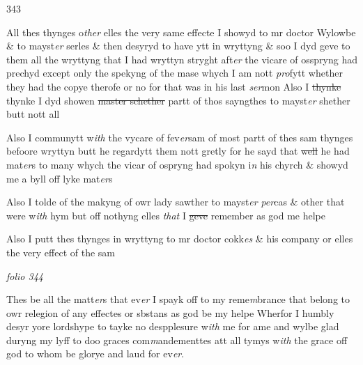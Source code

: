 \documentclass[12pt, a4paper]{book}
\begin{document}
\begin{flushright}{\color{Mahogany}343}\end{flushright}
            		
		\ifthenelse{\isodd{\thepage}}
		{\reversemarginpar}
		{\normalmarginpar}
		All thes thynges o\textit{ther} elles the very same effecte
I showyd to mr doctor Wylowbe \& to mayst\textit{er} serles
\& then desyryd to have ytt in wryttyng \& soo
I dyd geve to them all the wryttyng that I 
had wryttyn stryght aft\textit{er} the vicare of osspryng had
prechyd except only the spekyng of the mase
whych I am nott \textit{pro}fytt whether they had the 
copye therofe or no for that was in his
			 last \textit{ser}mon
Also I \sout{thynke} thynke I dyd showen \sout{master schether}
partt of thos sayngthes to mayst\textit{er} shether butt
nott all

            		
		\ifthenelse{\isodd{\thepage}}
		{\reversemarginpar}
		{\normalmarginpar}
		Also I communytt w\textit{ith}
			the vycare of fev\textit{er}sam of most 
partt of thes sam thynges befoore wryttyn butt
he regardytt them nott gretly for he sayd
that \sout{well }he had mat\textit{er}s to many whych the 
vicar of ospryng had spokyn i\textit{n}
            		his 
			chyrch \& showyd
me a byll off lyke mat\textit{er}s

            		
		\ifthenelse{\isodd{\thepage}}
		{\reversemarginpar}
		{\normalmarginpar}
		Also I tolde of the makyng of owr lady sawther
to mayst\textit{er}
               \textit{per}cas \& other that were w\textit{ith} hym but 
            		off nothyng 
			elles \textit{that} I \sout{geve }remember as god me helpe


		\ifthenelse{\isodd{\thepage}}
		{\reversemarginpar}
		{\normalmarginpar}
		Also I putt thes thynges in wryttyng to mr
doctor cokk\textit{es} \& his company or elles the 
			very effect of 
the sam

\dotfill
						\newpage
{}

\textit{folio 344}



		\ifthenelse{\isodd{\thepage}}
		{\reversemarginpar}
		{\normalmarginpar}
		Thes be all the matt\textit{er}s that ev\textit{er} I spayk
off to my reme\textit{m}brance that belong to owr
relegion of any effectes or sbstans as god
be my helpe Wherfor I humbly desyr yore 
lordshype to tayke no despplesure w\textit{ith} me for
ame and wylbe glad duryng my lyff to doo
graces 
			com\textit{m}andementtes att all tymys w\textit{ith} the grace 
			off 
god to whom be glorye and laud for ev\textit{er}.
\end{document}
